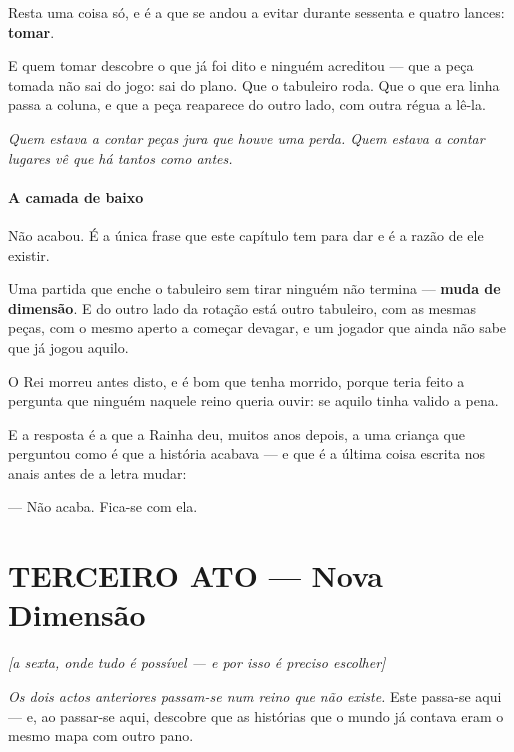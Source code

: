 \documentclass[livro.tex]{subfiles}
\begin{document}
Resta uma coisa só, e é a que se andou a evitar durante sessenta e quatro lances: \textbf{tomar}.

\medskip

E quem tomar descobre o que já foi dito e ninguém acreditou --- que a peça tomada não sai do jogo:
sai do plano. Que o tabuleiro roda. Que o que era linha passa a coluna, e que a peça reaparece do
outro lado, com outra régua a lê-la.

\medskip

\emph{Quem estava a contar peças jura que houve uma perda. Quem estava a contar lugares vê que há
tantos como antes.}

\subsection*{A camada de baixo}

Não acabou. É a única frase que este capítulo tem para dar e é a razão de ele existir.

\medskip

Uma partida que enche o tabuleiro sem tirar ninguém não termina --- \textbf{muda de dimensão}. E do
outro lado da rotação está outro tabuleiro, com as mesmas peças, com o mesmo aperto a começar
devagar, e um jogador que ainda não sabe que já jogou aquilo.

\medskip

O Rei morreu antes disto, e é bom que tenha morrido, porque teria feito a pergunta que ninguém
naquele reino queria ouvir: se aquilo tinha valido a pena.

\medskip

E a resposta é a que a Rainha deu, muitos anos depois, a uma criança que perguntou como é que a
história acabava --- e que é a última coisa escrita nos anais antes de a letra mudar:

\medskip

--- Não acaba. Fica-se com ela.



\part*{TERCEIRO ATO --- Nova Dimensão}
\noindent\hfill\emph{\small[a sexta, onde tudo é possível --- e por isso é preciso escolher]}\medskip

\noindent \emph{Os dois actos anteriores passam-se num reino que não existe.} Este passa-se aqui
--- e, ao passar-se aqui, descobre que as histórias que o mundo já contava eram o mesmo mapa
com outro pano.
\end{document}
